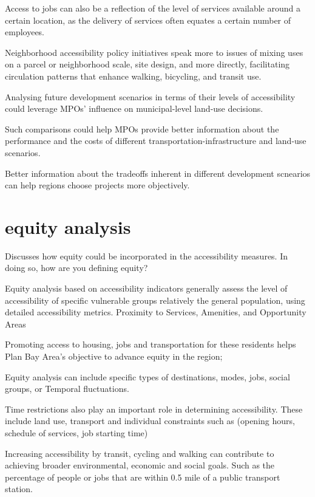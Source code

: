 \documentclass[12pt,]{article}
\begin{document}
Access to jobs can also be a reflection of the level of services
available around a certain location, as the delivery of services often
equates a certain number of employees.

Neighborhood accessibility policy initiatives speak more to issues of
mixing uses on a parcel or neighborhood scale, site design, and more
directly, facilitating circulation patterns that enhance walking,
bicycling, and transit use.

Analysing future development scenarios in terms of their levels of
accessibility could leverage MPOs' influence on municipal-level land-use
decisions.

Such comparisons could help MPOs provide better information about the
performance and the costs of different transportation-infrastructure and
land-use scenarios.

Better information about the tradeoffs inherent in different development
scnearios can help regions choose projects more objectively.

\hypertarget{equity-analysis}{%
\section{equity analysis}\label{equity-analysis}}

Discusses how equity could be incorporated in the accessibility
measures. In doing so, how are you defining equity?

Equity analysis based on accessibility indicators generally assess the
level of accessibility of specific vulnerable groups relatively the
general population, using detailed accessibility metrics. Proximity to
Services, Amenities, and Opportunity Areas

Promoting access to housing, jobs and transportation for these residents
helps Plan Bay Area's objective to advance equity in the region;

Equity analysis can include specific types of destinations, modes, jobs,
social groups, or Temporal fluctuations.

Time restrictions also play an important role in determining
accessibility. These include land use, transport and individual
constraints such as (opening hours, schedule of services, job starting
time)

Increasing accessibility by transit, cycling and walking can contribute
to achieving broader environmental, economic and social goals. Such as
the percentage of people or jobs that are within 0.5 mile of a public
transport station.
\end{document}

